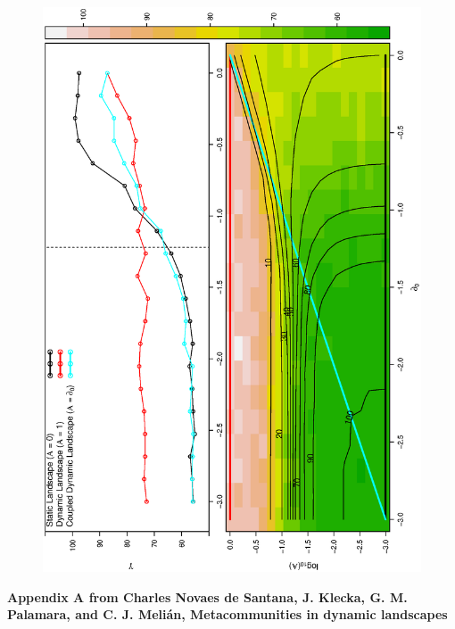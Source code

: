 \documentclass[12pt]{article}
\makeatletter
\renewcommand{\@biblabel}[1]{\quad#1.}
\makeatother
\begin{document}
\begin{figure}[hb!]
\begin{center}
\hspace{-0.5 in}\includegraphics[width=4.5in,angle=-90]{./figures/Figure_7_00127}
\end{center}
\caption{}
\label{fig:Figure6}
\end{figure}


\appendix
\makeatletter
\renewcommand{\@biblabel}[1]{\quad#1.}
\renewcommand{\thefigure}{S\@arabic\c@figure} 
\makeatother
\pagestyle{myheadings}

\clearpage
\begin{flushleft} 
{\Large \textbf{Appendix A from Charles Novaes de Santana, J. Klecka, G. M. Palamara, and C. J. Meli\'{a}n, Metacommunities in dynamic landscapes}}
\end{flushleft}
\renewcommand{\theequation}{A-\arabic{equation}}
\setcounter{equation}{0}
\renewcommand{\thesection}{A\arabic{section}}
\renewcommand{\thefigure}{A\arabic{figure}}
\renewcommand{\thetable}{A\arabic{table}}
\setcounter{figure}{0}
\setcounter{table}{0}
\end{document}
